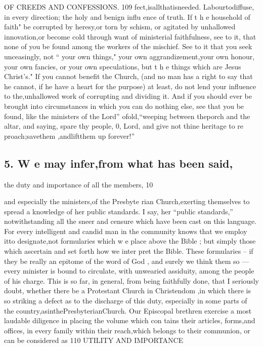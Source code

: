 \documentclass[
]{book}
\begin{document}
OF CREEDS AND CONFESSIONS. 109
fect,isallthatisneeded. Labourtodiffuse, in every direction; the holy and benign influ ence of truth. If t h e household of faith"
be corrupted by heresy,or torn by schism, or agitated by unhallowed innovation,or become
cold through want of ministerial faithfulness,
see to it, that none of you be found among the workers of the mischief. See to it that
you seek unceasingly, not `` your own things," your own aggrandizement,your own honour,
your own fancies, or your own speculations, but t h e things which are Jesus Christ's." If you cannot benefit the Church, (and no man has a right to say that he cannot, if he have a heart for the purpose) at least, do
not lend your influence to the,unhallowed
work of corrupting and dividing it. And if
you should ever be brought into circumstances
in which you can do nothing else, see that you be found, like the ministers of the
Lord'' ofold,``weeping between theporch and the altar, and saying, spare thy people,
0, Lord, and give not thine heritage to re proach;savethem ,andliftthem up forever!''

\hypertarget{w-e-may-inferfrom-what-has-been-said}{%
\subsection{5. W e may infer,from what has been said,}\label{w-e-may-inferfrom-what-has-been-said}}

the duty and importance of all the members, 10

and especially the ministers,of the Presbyte
rian Church,exerting themselves to spread a knowledge of her public standards. I say,
her ``public standards,'' notwithstanding all the sneer and censure which have been cast
on this language. For every intelligent and
candid man in the community knows that we
employ itto designate,not formularies which
w e place above the Bible ; but simply those which ascertain and set forth how we inter
pret the Bible. These formularies -- if they
be really an epitome of the word of God , and
surely we think them so --- every minister is bound to circulate, with unwearied assiduity, among the people of his charge. This is so
far, in general, from being faithfully done,
that I seriously doubt, whether there be a
Protestant Church in Christendom ,in which
there is so striking a defect as to the discharge
of this duty, especially in some parts of the
country,asinthePresbyterianChurch. Our
Episcopal brethren exercise a most laudable
diligence in placing the volume which con tains their articles, forms,and offices, in every
family within their reach,which belongs to their communion, or can be considered as
110 UTILITY AND IMPORTANCE
\end{document}
